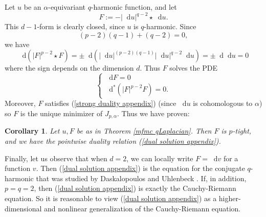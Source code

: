 \documentclass[reqno,11pt]{amsart}
\newcommand*\dif{\mathop{}\!\mathrm{d}}
\newtheorem{corollary}[theorem]{Corollary}
\theoremstyle{definition}
\numberwithin{equation}{section}
\begin{document}
Let $u$ be an $\alpha$-equivariant $q$-harmonic function, and let 
\begin{equation}\label{dual solution appendix}
F := -|\dif u|^{q - 2} \star \dif u.
\end{equation}
This $d - 1$-form is clearly closed, since $u$ is $q$-harmonic.
Since
$$(p - 2)(q - 1) + (q - 2) = 0,$$
we have 
$$\dif(|F|^{p - 2} \star F) = \pm \dif(|\dif u|^{(p - 2)(q - 1)} |\dif u|^{q - 2} \dif u) = \pm \dif \dif u = 0$$
where the sign depends on the dimension $d$.
Thus $F$ solves the PDE 
\begin{equation}\label{pMaxwell}
\begin{cases}
	\dif F = 0 \\
	\dif^* (|F|^{p - 2} F) = 0.
\end{cases}
\end{equation}
Moreover, $F$ satisfies (\ref{strong duality appendix}) (since $\dif u$ is cohomologous to $\alpha$) so $F$ is the unique minimizer of $J_{p, \alpha}$.
Thus we have proven:

\begin{corollary}
Let $u, F$ be as in Theorem \ref{mfmc qLaplacian}.
Then $F$ is $p$-tight, and we have the pointwise duality relation (\ref{dual solution appendix}).
\end{corollary}

Finally, let us observe that when $d = 2$, we can locally write $F = \dif v$ for a function $v$.
Then (\ref{dual solution appendix}) is the equation for the conjugate $q$-harmonic that was studied by Daskalopoulos and Uhlenbeck \cite[\S3]{daskalopoulos2020transverse}.
If, in addition, $p = q = 2$, then (\ref{dual solution appendix}) is exactly the Cauchy-Riemann equation.
So it is reasonable to view (\ref{dual solution appendix}) as a higher-dimensional and nonlinear generalization of the Cauchy-Riemann equation.



\printbibliography
\end{document}
